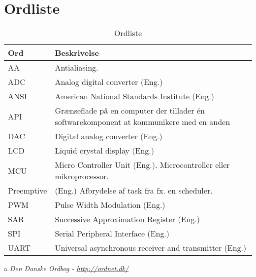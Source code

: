 \chapter{Ordliste} \label{bilag:ordliste}

\begin{table}[h!]
	\caption{Ordliste}
	\label{tab:ordliste}
	\begin{threeparttable}
		\begin{tabular}{l p{}}
			\toprule
			\textbf{Ord}      & \textbf{Beskrivelse}   \\ 
			\midrule
			AA			& Antialiasing.\\
			ADC			& Analog digital converter (Eng.)\\
			ANSI		& American National Standards Institute (Eng.)\\
			API			& Grænseflade på en computer der tillader én softwarekomponent at kommunikere med en anden\tnote{a}\\
			DAC			& Digital analog converter (Eng.)\\
			LCD			& Liquid crystal display (Eng.) \\
			MCU       	& Micro Controller Unit (Eng.). Microcontroller eller mikroprocessor. \\
			Preemptive	& (Eng.) Afbrydelse af task fra fx. en scheduler.\\
			PWM			& Pulse Width Modulation (Eng.) \\
			SAR			& Successive Approximation Register (Eng.)\\
			SPI			& Serial Peripheral Interface (Eng.)  \\
			UART		& Universal asynchronous receiver and transmitter (Eng.)\\
			\bottomrule
		\end{tabular}
	
		\begin{tablenotes}
			\item[a] \textit{Den Danske Ordbog - \url{http://ordnet.dk/}}
		\end{tablenotes}
	\end{threeparttable}
\end{table}
